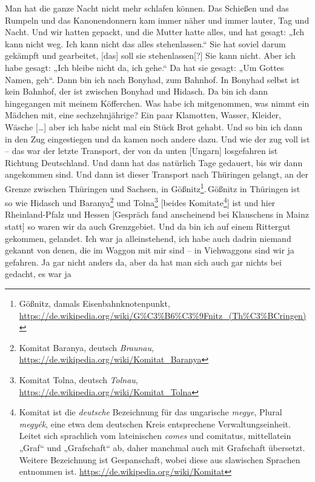 \documentclass[ngerman,]{article}
\providecommand{\tightlist}{%
  \setlength{\itemsep}{0pt}\setlength{\parskip}{0pt}}
\begin{document}
\begin{multicols}{3}
\begin{description}
\tightlist
\item[Käthe]
Man hat die ganze Nacht nicht mehr schlafen können. Das Schießen und das
Rumpeln und das Kanonendonnern kam immer näher und immer lauter, Tag und
Nacht. Und wir hatten gepackt, und die Mutter hatte alles, und hat
gesagt: „Ich kann nicht weg. Ich kann nicht das alles stehenlassen.“ Sie
hat soviel darum gekämpft und gearbeitet, {[}das{]} soll sie
stehenlassen{[}?{]} Sie kann nicht. Aber ich habe gesagt: „Ich bleibe
nicht da, ich gehe.“ Da hat sie gesagt: „Um Gottes Namen, geh“. Dann bin
ich nach Bonyhad, zum Bahnhof. In Bonyhad selbst ist kein Bahnhof, der
ist zwischen Bonyhad und Hidasch. Da bin ich dann hingegangen mit meinem
Köfferchen. Was habe ich mitgenommen, was nimmt ein Mädchen mit, eine
sechzehnjährige? Ein paar Klamotten, Wasser, Kleider, Wäsche
{[}\ldots{}{]} aber ich habe nicht mal ein Stück Brot gehabt. Und so bin
ich dann in den Zug eingestiegen und da kamen noch andere dazu. Und wie
der zug voll ist – das war der letzte Transport, der von da unten
{[}Ungarn{]} losgefahren ist Richtung Deutschland. Und dann hat das
natürlich Tage gedauert, bis wir dann angekommen sind. Und dann ist
dieser Transport nach Thüringen gelangt, an der Grenze zwischen
Thüringen und Sachsen, in Gößnitz\footnote{Gößnitz, damals
  Eisenbahnknotenpunkt,
  \url{https://de.wikipedia.org/wiki/G\%C3\%B6\%C3\%9Fnitz_(Th\%C3\%BCringen)}}.\,Gößnitz
in Thüringen ist so wie Hidasch und Baranya\footnote{Komitat Baranya,
  deutsch \emph{Braunau},
  \url{https://de.wikipedia.org/wiki/Komitat_Baranya}} und
Tolna\footnote{Komitat Tolna, deutsch \emph{Tolnau},
  \url{https://de.wikipedia.org/wiki/Komitat_Tolna}} {[}beides
Komitate\footnote{Komitat ist die \emph{deutsche} Bezeichnung für das
  ungarische \emph{megye}, Plural \emph{megyék}, eine etwa dem deutschen
  Kreis entsprechene Verwaltungseinheit. Leitet sich sprachlich vom
  lateinischen \emph{comes} und comitatus, mittellatein „Graf“ und
  „Grafschaft“ ab, daher manchmal auch mit Grafschaft übersetzt. Weitere
  Bezeichnung ist Gespanschaft, wobei diese aus slawischen Sprachen
  entnommen ist. \url{https://de.wikipedia.org/wiki/Komitat}}{]} ist und
hier Rheinland-Pfalz und Hessen {[}Gespräch fand anscheinend bei
Klauschens in Mainz statt{]} so waren wir da auch Grenzgebiet. Und da
bin ich auf einem Rittergut gekommen, gelandet. Ich war ja
alleinstehend, ich habe auch dadrin niemand gekannt von denen, die im
Waggon mit mir sind – in Viehwaggons sind wir ja gefahren. Ja gar nicht
anders da, aber da hat man sich auch gar nichts bei gedacht, es war ja

\end{description}
\end{multicols}
\end{document}
